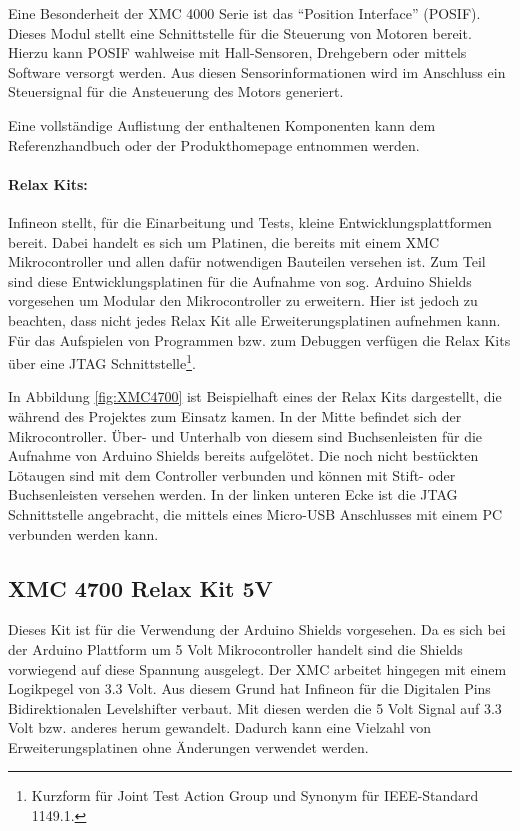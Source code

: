 Eine Besonderheit der XMC 4000 Serie ist das \enquote{Position Interface} (POSIF).
Dieses Modul stellt eine Schnittstelle für die Steuerung von Motoren bereit.
Hierzu kann POSIF wahlweise mit Hall-Sensoren, Drehgebern oder mittels Software versorgt werden.
Aus diesen Sensorinformationen wird im Anschluss ein Steuersignal für die Ansteuerung des Motors generiert.\cite{InfineonTechnologies2016a}

Eine vollständige Auflistung der enthaltenen Komponenten kann dem Referenzhandbuch \cite{InfineonTechnologies2016} oder der Produkthomepage \cite{InfineonTechnologies2017} entnommen werden.

\newpage
\paragraph{Relax Kits:}
Infineon stellt, für die Einarbeitung und Tests, kleine Entwicklungsplattformen bereit.
Dabei handelt es sich um Platinen, die bereits mit einem XMC Mikrocontroller und allen dafür notwendigen Bauteilen versehen ist.
Zum Teil sind diese Entwicklungsplatinen für die Aufnahme von sog. Arduino Shields vorgesehen um Modular den Mikrocontroller zu erweitern.
Hier ist jedoch zu beachten, dass nicht jedes Relax Kit alle Erweiterungsplatinen aufnehmen kann.
Für das Aufspielen von Programmen bzw. zum Debuggen verfügen die Relax Kits über eine JTAG Schnittstelle\footnote{Kurzform für Joint Test Action Group und Synonym für IEEE-Standard 1149.1.}.

In Abbildung \ref{fig:XMC4700} ist Beispielhaft eines der Relax Kits dargestellt, die während des Projektes zum Einsatz kamen.
In der Mitte befindet sich der Mikrocontroller. 
Über- und Unterhalb von diesem sind Buchsenleisten für die Aufnahme von Arduino Shields bereits aufgelötet.
Die noch nicht bestückten Lötaugen sind mit dem Controller verbunden und können mit Stift- oder Buchsenleisten versehen werden.
In der linken unteren Ecke ist die JTAG Schnittstelle angebracht, die mittels eines Micro-USB Anschlusses mit einem PC verbunden werden kann. 
\subsection{XMC 4700 Relax Kit 5V}
\label{sec:XMC4700}
Dieses Kit ist für die Verwendung der Arduino Shields vorgesehen.
Da es sich bei der Arduino Plattform um 5 Volt Mikrocontroller handelt sind die Shields vorwiegend auf diese Spannung ausgelegt.
Der XMC arbeitet hingegen mit einem Logikpegel von 3.3 Volt.
Aus diesem Grund hat Infineon für die Digitalen Pins Bidirektionalen Levelshifter verbaut.
Mit diesen werden die 5 Volt Signal auf 3.3 Volt bzw. anderes herum gewandelt.
Dadurch kann eine Vielzahl von Erweiterungsplatinen ohne Änderungen verwendet werden.

